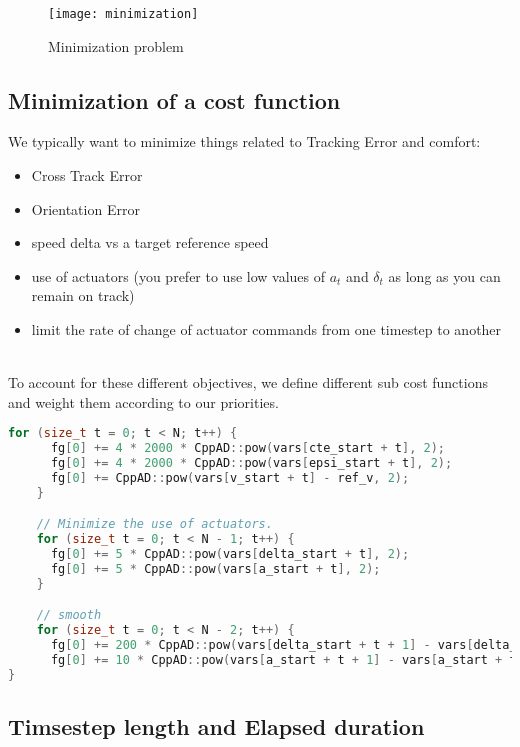 \documentclass[11pt]{article}
\begin{document}
\begin{figure}[h]
    \centering
    \texttt{[image: minimization]}
    \caption{Minimization problem}
    \label{fig:minimization}
\end{figure} 

\subsection{Minimization of a cost function}

We typically want to minimize things related to Tracking Error and comfort:
\begin{itemize}
\item Cross Track Error
\item Orientation Error
\item speed delta vs a target reference speed
\item use of actuators (you prefer to use low values of $a_t$ and $\delta_t$ as long as you can remain on track)
\item limit the rate of change of actuator commands from one timestep to another
\
\end{itemize}

To account for these different objectives, we define different sub cost functions and weight them according to our priorities.

\begin{lstlisting}[language=C++, caption={Cost function example}]
    for (size_t t = 0; t < N; t++) {
      fg[0] += 4 * 2000 * CppAD::pow(vars[cte_start + t], 2);
      fg[0] += 4 * 2000 * CppAD::pow(vars[epsi_start + t], 2);
      fg[0] += CppAD::pow(vars[v_start + t] - ref_v, 2);
    }

    // Minimize the use of actuators.
    for (size_t t = 0; t < N - 1; t++) {
      fg[0] += 5 * CppAD::pow(vars[delta_start + t], 2);
      fg[0] += 5 * CppAD::pow(vars[a_start + t], 2);
    }

    // smooth
    for (size_t t = 0; t < N - 2; t++) {
      fg[0] += 200 * CppAD::pow(vars[delta_start + t + 1] - vars[delta_start + t], 2);
      fg[0] += 10 * CppAD::pow(vars[a_start + t + 1] - vars[a_start + t], 2);
}
\end{lstlisting}


\subsection{Timsestep length and Elapsed duration}
\end{document}
